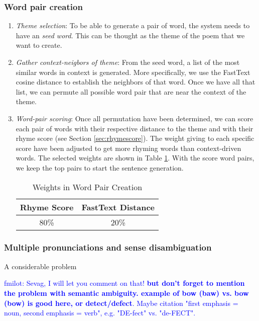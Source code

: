 \documentclass[11pt,a4paper]{article}
\begin{document}
\subsubsection{Word pair creation}
\begin{enumerate}
	\item \textit{Theme selection}: To be able to generate a pair of word, the system needs to have an \textit{seed word}. This can be thought as the theme of the poem that we want to create.
	\item \textit{Gather context-neigbors of theme}: From the seed word, a list of the most similar words in context is generated. More specifically, we use the FastText cosine distance to establish the neighbors of that word. Once we have all that list, we can permute all possible word pair that are near the context of the theme.
	\item \textit{Word-pair scoring}: Once all permutation have been determined, we can score each pair of words with their respective distance to the theme and with their rhyme score (see Section \ref{sec:rhymescore}). The weight giving to each specific score have been adjusted to get more rhyming words than context-driven words. The selected weights are shown in Table \ref{table:weight_wordpair}. With the score word pairs, we keep the top pairs to start the sentence generation.
\begin{table}[ht]
\centering
\begin{tabular}{c c}
	\hline\hline
	Rhyme Score & FastText Distance\\ [0.5ex]
	\hline
	80\% & 20\% \\ [0.5ex]
	\hline
\end{tabular}
\caption{Weights in Word Pair Creation}
\label{table:weight_wordpair}
\end{table}
\end{enumerate}

\subsubsection{Multiple pronunciations and sense disambiguation}

A considerable problem

\textcolor{blue}{
fmilot: Sevag, I will let you comment on that!
\textbf{but don't forget to mention the problem with semantic ambiguity. example of bow (baw) vs. bow (bow) is good here, or detect/defect}. Maybe citation "first emphasis = noun, second emphasis = verb", e.g. "DE-fect" vs. "de-FECT".
}
\end{document}
